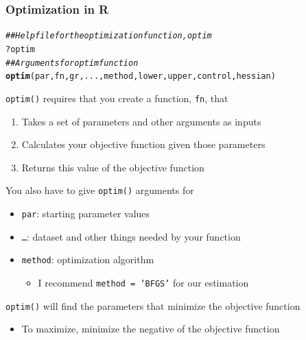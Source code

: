 \documentclass{beamer}\usepackage[]{graphicx}\usepackage[]{color}
\makeatletter
\newcommand{\hlcom}[1]{\textcolor[rgb]{0.678,0.584,0.686}{\textit{#1}}}%
\newcommand{\hlopt}[1]{\textcolor[rgb]{0,0,0}{#1}}%
\newcommand{\hlstd}[1]{\textcolor[rgb]{0.345,0.345,0.345}{#1}}%
\newcommand{\hlkwd}[1]{\textcolor[rgb]{0.737,0.353,0.396}{\textbf{#1}}}%
\newenvironment{kframe}{%
 \def\at@end@of@kframe{}%
 \ifinner\ifhmode%
  \def\at@end@of@kframe{\end{minipage}}%
  \begin{minipage}{\columnwidth}%
 \fi\fi%
 \def\FrameCommand##1{\hskip\@totalleftmargin \hskip-\fboxsep
 \colorbox{shadecolor}{##1}\hskip-\fboxsep
     \hskip-\linewidth \hskip-\@totalleftmargin \hskip\columnwidth}%
 \MakeFramed {\advance\hsize-\width
   \@totalleftmargin\z@ \linewidth\hsize
   \@setminipage}}%
 {\par\unskip\endMakeFramed%
 \at@end@of@kframe}
\newenvironment{knitrout}{}{} %
\makeatother
\begin{document}
\begin{frame}[fragile]\frametitle{Optimization in R}
\begin{knitrout}\footnotesize
{}\color{fgcolor}\begin{kframe}
\begin{alltt}
\hlcom{## Help file for the optimization function, optim}
\hlopt{?}\hlstd{optim}
\hlcom{## Arguments for optim function}
\hlkwd{optim}\hlstd{(par, fn, gr, ..., method, lower, upper, control, hessian)}
\end{alltt}
\end{kframe}
\end{knitrout}
    \vspace{1ex}
    \texttt{optim()} requires that you create a function, \texttt{fn}, that
    \begin{enumerate}
        \item Takes a set of parameters and other arguments as inputs
        \item Calculates your objective function given those parameters
        \item Returns this value of the objective function
    \end{enumerate}
    \vspace{1ex}
    You also have to give \texttt{optim()} arguments for
    \begin{itemize}
        \item \texttt{par}: starting parameter values
        \item \texttt{\ldots}: dataset and other things needed by your function
        \item \texttt{method}: optimization algorithm
        \begin{itemize}
            \item I recommend \texttt{method = `BFGS'} for our estimation
        \end{itemize}
    \end{itemize}
    \vspace{1ex}
    \texttt{optim()} will find the parameters that minimize the objective function
    \begin{itemize}
        \item To maximize, minimize the negative of the objective function
    \end{itemize}
\end{frame}
\end{document}
